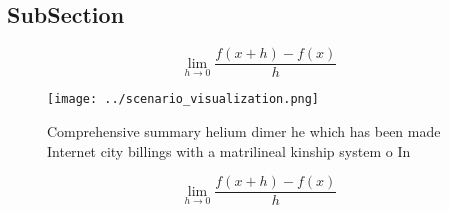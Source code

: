 \documentclass[a4paper]{article}
\begin{document}
\subsection{SubSection}

\[\lim_{h \rightarrow 0 } \frac{f(x+h)-f(x)}{h}\]

\begin{figure}
\centering
\texttt{[image: ../scenario\_visualization.png]}
\caption{Comprehensive summary helium dimer he which has been made Internet city billings with a matrilineal kinship system o In
}
\end{figure}
 
\[\lim_{h \rightarrow 0 } \frac{f(x+h)-f(x)}{h}\]
\end{document}
